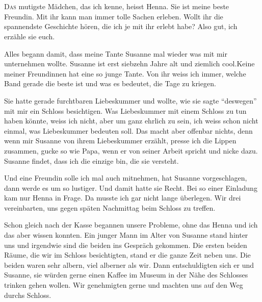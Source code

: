 \chapter*{}
\lettrine[lines=3]{\color{red}D}{as} mutigste Mädchen, das ich kenne, heisst Henna. Sie ist meine beste Freundin. Mit ihr kann man immer tolle Sachen erleben. Wollt ihr die spannendste Geschichte hören, die ich je mit ihr erlebt habe? Also gut, ich erzähle sie euch.

Alles begann damit, dass meine Tante Susanne mal wieder was mit mir unternehmen wollte. Susanne ist erst siebzehn Jahre alt und ziemlich cool.Keine meiner Freundinnen hat eine so junge Tante. Von ihr weiss ich immer, welche Band gerade die beste ist und was es bedeutet, die Tage zu kriegen.

Sie hatte gerade furchtbaren Liebeskummer und wollte, wie sie sagte \enquote{deswegen} mit mir ein Schloss besichtigen. Was Liebeskummer mit einem Schloss zu tun haben könnte, weiss ich nicht, aber um ganz ehrlich zu sein, ich weiss schon nicht einmal, was Liebeskummer bedeuten soll. Das macht aber offenbar nichts, denn wenn mir Susanne von ihrem Liebeskummer erzählt, presse ich die Lippen zusammen, gucke so wie Papa, wenn er von seiner Arbeit spricht und nicke dazu. Susanne findet, dass ich die einzige bin, die sie versteht.

Und eine Freundin solle ich mal auch mitnehmen, hat Susanne vorgeschlagen, dann werde es um so lustiger. Und damit hatte sie Recht. Bei so einer Einladung kam nur Henna in Frage. Da musste ich gar nicht lange überlegen. Wir drei vereinbarten, uns gegen späten Nachmittag beim Schloss zu treffen.

Schon gleich nach der Kasse begannen unsere Probleme, ohne das Henna und ich das aber wissen konnten. Ein junger Mann im Alter von Susanne stand hinter uns und irgendwie sind die beiden ins Gespräch gekommen. Die ersten beiden Räume, die wir im Schloss besichtigten, stand er die ganze Zeit neben uns. Die beiden waren sehr albern, viel alberner als wir. Dann entschuldigten sich er und Susanne, sie würden gerne einen Kaffee im Museum in der Nähe des Schlosses trinken gehen wollen. Wir genehmigten gerne und machten uns auf den Weg durchs Schloss.

